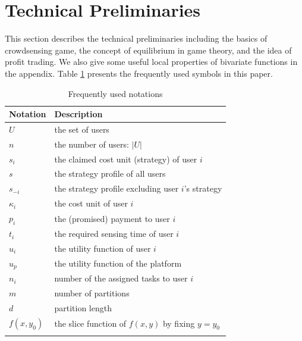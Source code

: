 \documentclass[conference]{IEEEtran}
\theoremstyle{definition}
\begin{document}
\section{Technical Preliminaries}
\label{sec:TP}
This section describes the technical preliminaries including the basics of crowdsensing game, the concept of equilibrium in game theory, and the idea of profit trading. We also give some useful local properties of bivariate functions in the appendix. Table \ref{tab:symbol_list} presents the frequently used symbols in this paper.
\begin{table}[!t]
\begin{tabular}{l l}
\toprule
Notation & Description\\
\hline
$U$ & the set of users\\
$n$ & the number of users: $|U|$ \\
$s_i$ & the claimed cost unit (strategy) of user $i$\\
$s$ & the strategy profile of all users \footnotemark[1]\\
$s_{-i}$ & the strategy profile excluding user $i$'s strategy\\
$\kappa_i$ & the cost unit of user $i$\\
$p_i$ & the (promised) payment to user $i$\\
$t_i$ & the required sensing time of user $i$\\
$u_i$ & the utility function of user $i$\\
$u_p$ & the utility function of the platform\\
$n_i$ & number of the assigned tasks to user $i$\\
$m$	& number of partitions\\
$d$ & partition length\\
$f(x, y_0)$ & the slice function of $f(x,y)$ by fixing $y = y_0$\\
\bottomrule
\smallskip
\end{tabular}
\caption{Frequently used notations}
\label{tab:symbol_list}
\end{table}
\addtocounter{footnote}{1}
\end{document}
